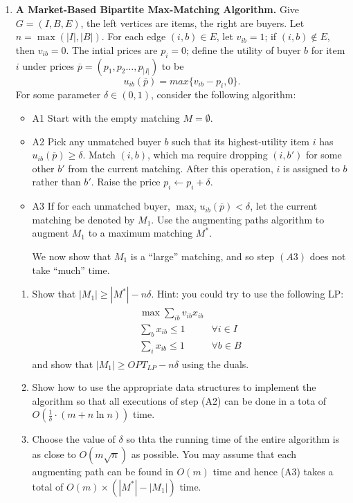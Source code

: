\documentclass{article}
\theoremstyle{plain}
\newcommand\litem[1]{\item{\bfseries#1.\space}}
\begin{document}
\begin{enumerate}
for $f_i \in G$, such that
$\textrm{err}_{S, \ell, w}(\hat{f}) \leq \epsilon$. (Hint: Start off
with the simple case where the weights of the points in $S$ are
$w(x) = 1$ for all $x \in S$; it contains all the ideas. Also, recall
the analysis of the Hedge or Weighted Majority even if you don’t use
these algorithms themselves.)

\litem{A Market-Based Bipartite Max-Matching Algorithm} Give $G = (I, B, E)$, the left vertices are items, the right are buyers. Let $n = \max(|I|, |B|)$. For each edge $(i,b) \in E$, let $v_{ib} = 1$; if $(i,b)\not\in E$, then $v_{ib} = 0$. The intial prices are $p_i = 0$; define the utility of buyer $b$ for item $i$ under prices $\overline{p} = (p_1, p_2 \ldots, p_{|I|})$ to be
\[u _ { i b } ( \overline { p } ) = m a x \{ v _ { i b } - p _ { i } ,0\}.\]
%
For some parameter $\delta \in (0,1)$, consider the following algorithm:
\begin{itemize}
\item{A1} Start with the empty matching $M = \emptyset$.
\item{A2} Pick any unmatched buyer $b$ such that its highest-utility
  item $i$ has $u_{ib}(\overline{p})\geq \delta$. Match $(i,b)$, which
  ma require dropping $(i,b')$ for some other $b'$ from the current
  matching.  After this operation, $i$ is assigned to $b$ rather than
  $b'$. Raise the price $p_i \gets p_i + \delta$.
\item{A3} If for each unmatched buyer,
  $\max_i u_{ib}(\overline{p}) < \delta$, let the current matching be
  denoted by $M_1$. Use the augmenting paths algorithm to augment
  $M_1$ to a maximum matching $M^*$.

  We now show that $M_1$ is a ``large'' matching, and so step $(A3)$ does not take ``much'' time.
\end{itemize}
\begin{enumerate}
\item Show that $|M_1| \geq |M^*| - n\delta$. Hint: you could try to use the following LP:
  \begin{align*}
    \left.\begin{array} { ll } { \max \sum _ { i b } v _ { i b } x _ { i b } } \\
            { \sum _ { b } x _ { i b } \leq 1} & { \forall i \in I } \\
            { \sum _ { i } x _ { i b } \leq 1} & { \forall b \in B } \end{array} \right.
  \end{align*}
  and show that $|M_1| \geq OPT_{LP} -  n \delta$ using the duals.
\item Show how to use the appropriate data structures to implement the algorithm so that all executions of step (A2) can be done in a tota of $O(\frac{1}{\delta}\cdot (m + n \ln n))$ time.
\item Choose the value of $\delta$ so thta the running time of the
  entire algorithm is as close to $O(m \sqrt{n})$ as possible. You may
  assume that each augmenting path can be found in $O(m)$ time and
  hence (A3) takes a total of $O(m) \times (|M^*| - |M_1|)$ time.


\end{enumerate}
\end{enumerate}
\end{document}
